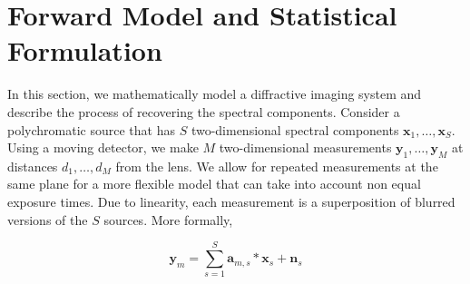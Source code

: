 \documentclass{article}
\begin{document}


\section{Forward Model and Statistical Formulation}
\label{sec:format}
In this section, we mathematically model a diffractive imaging
system and describe the process of recovering the spectral components. Consider
a polychromatic source that has $S$ two-dimensional spectral components
$\bm{x}_1, \dots, \bm{x}_S$. Using a moving detector, we make $M$
two-dimensional measurements $\bm{y}_1, \dots, \bm{y}_M$ at distances $d_1,
\dots, d_M$ from the lens. We allow for repeated measurements at the same plane
for a more flexible model that can take into account non equal exposure times.
Due to linearity, each measurement is a superposition of blurred versions
of the $S$ sources. More formally,

\begin{equation}
\bm{y}_m = \sum_{s=1}^S \bm{a}_{m,s} \ast \bm{x}_s + \bm{n}_s
\label{eq:fwd_model}
\end{equation}
\end{document}
